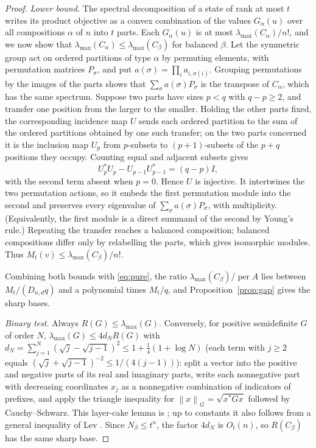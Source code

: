 \documentclass[11pt,a4paper]{article}
\theoremstyle{remark}
\newcommand{\per}{\operatorname{per}}
\newcommand{\norm}[1]{\left\lVert#1\right\rVert}
\begin{document}
\begin{proof}
\emph{Lower bound.} The spectral decomposition of a state of rank at most $t$ writes its product objective as a convex combination of the values $G_\alpha(u)$ over all compositions $\alpha$ of $n$ into $t$ parts. Each $G_\alpha(u)$ is at most $\lambda_{\max}(C_\alpha)/n!$, and we now show that $\lambda_{\max}(C_\alpha)\le\lambda_{\max}(C_\beta)$ for balanced $\beta$. Let the symmetric group act on ordered partitions of type $\alpha$ by permuting elements, with permutation matrices $P_\sigma$, and put $a(\sigma)=\prod_ia_{i,\sigma(i)}$. Grouping permutations by the images of the parts shows that $\sum_\sigma a(\sigma)P_\sigma$ is the transpose of $C_\alpha$, which has the same spectrum. Suppose two parts have sizes $p<q$ with $q-p\ge2$, and transfer one position from the larger to the smaller. Holding the other parts fixed, the corresponding incidence map $U$ sends each ordered partition to the sum of the ordered partitions obtained by one such transfer; on the two parts concerned it is the inclusion map $U_p$ from $p$-subsets to $(p+1)$-subsets of the $p+q$ positions they occupy. Counting equal and adjacent subsets gives
\[
 U_p^*U_p-U_{p-1}U_{p-1}^*=(q-p)I,
\]
with the second term absent when $p=0$. Hence $U$ is injective. It intertwines the two permutation actions, so it embeds the first permutation module into the second and preserves every eigenvalue of $\sum_\sigma a(\sigma)P_\sigma$, with multiplicity. (Equivalently, the first module is a direct summand of the second by Young's rule.) Repeating the transfer reaches a balanced composition; balanced compositions differ only by relabelling the parts, which gives isomorphic modules. Thus $M_t(v)\le\lambda_{\max}(C_\beta)/n!$.

Combining both bounds with \eqref{eq:pure}, the ratio $\lambda_{\max}(C_\beta)/\per A$ lies between $M_t/(D_{n,d}q)$ and a polynomial times $M_t/q$, and Proposition~\ref{prop:gap} gives the sharp bases.

\emph{Binary test.} Always $R(G)\le\lambda_{\max}(G)$. Conversely, for positive semidefinite $G$ of order $N$, $\lambda_{\max}(G)\le4d_NR(G)$ with $d_N=\sum_{j=1}^N(\sqrt j-\sqrt{j-1})^2\le1+\tfrac14(1+\log N)$ (each term with $j\ge2$ equals $(\sqrt j+\sqrt{j-1})^{-2}\le1/(4(j-1))$): split a vector into the positive and negative parts of its real and imaginary parts, write each nonnegative part with decreasing coordinates $x_j$ as a nonnegative combination of indicators of prefixes, and apply the triangle inequality for $\norm x_G=\sqrt{x^*Gx}$ followed by Cauchy--Schwarz. This layer-cake lemma is \cite[Lemma~2.1]{EPBS}; up to constants it also follows from a general inequality of Lev \cite[Theorem~2]{Lev}. Since $N_\beta\le t^n$, the factor $4d_N$ is $O_t(n)$, so $R(C_\beta)$ has the same sharp base.
\end{proof}
\end{document}
